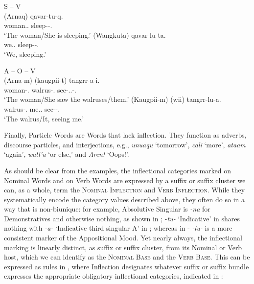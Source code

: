 \documentclass[output=paper]{langscibook}
\begin{document}
\ea\label{ex:key:4} S – V \\
 \ea\label{ex:key:4a}
 \gll (Arnaq) qavar-tu-q.\\
     woman.\Abs.\Sg{} sleep-\Ind{}-\Tsg.\Sarg{}\\
 \glt `The woman/She is sleeping.'
 \ex\label{ex:key:4b}
 \gll (Wangkuta) qavar-lu-ta. \\
     we.\Abs.\Pl{} sleep-\Appos-\Fpl.\Sarg{}\\
 \glt `We, sleeping.'
 \z
\z

\ea\label{ex:key:5}
A – O – V \\
 \ea\label{ex:key:5a}
 \gll (Arna-m) (kaugpii-t) tangrr-a-i.\\
     woman-\Relc.\Sg{} walrus-\Abs.\Pl{} see-\Ind{}.\Tsg.\Aarg{}-\Tpl.\Obj{} \\
 \glt `The woman/She saw the walruses/them.'
 \ex\label{ex:key:5b}
 \gll (Kaugpii-m) (wii) tangrr-lu-a.\\
     walrus-\Relc.\Sg{} me.\Abs.\Sg{} see-\Appos-\Fsg.\Obj{}\\
 \glt `The walrus/It, seeing me.'
 \z
\z

Finally, Particle Words are Words that lack inflection. They function as adverbs, discourse particles, and interjections, e.g., \textit{unuaqu} `tomorrow', \textit{cali} `more', \textit{ataam} `again', \textit{wall'u} `or else,' and \textit{Aren!} `Oops!'.

As should be clear from the examples, the inflectional categories marked on Nominal Words and on Verb Words are expressed by a suffix or suffix cluster we can, as a whole, term the \textsc{Nominal} \textsc{Inflection} and \textsc{Verb} \textsc{Inflection}. While they systematically encode the category values described above, they often do so in a way that is non-biunique: for example, Absolutive Singular is \textit{{}-na} for Demonstratives and otherwise nothing, as shown in ; -\textit{tu-} `Indicative' in  shares nothing with \textit{{}-a-} `Indicative third singular A' in ; whereas in - \textit{-lu-} is a more consistent marker of the
Appositional Mood. Yet nearly always, the inflectional marking is linearly distinct, as suffix or suffix cluster, from its Nominal or Verb host, which we can identify as the \textsc{Nominal} \textsc{Base} and the \textsc{Verb} \textsc{Base}. This can be expressed as rules in , where Inflection designates whatever suffix or suffix bundle expresses the appropriate obligatory inflectional categories, indicated in :
\end{document}
